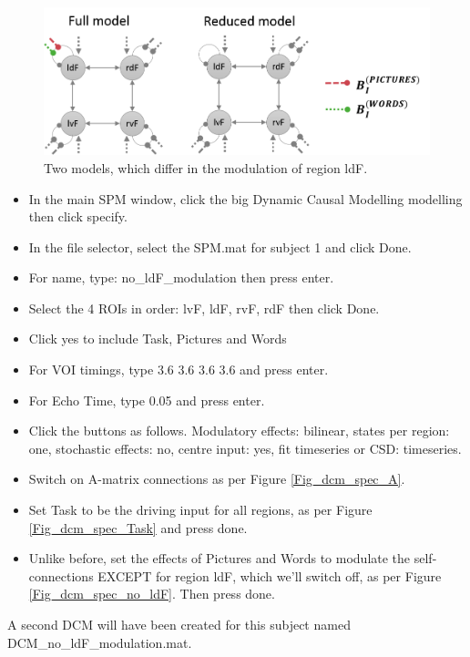 \documentclass{article}
\begin{document}
\begin{figure}[ht]
\begin{center}
\includegraphics{"Fig_dcm_spec_2models"}
\caption{Two models, which differ in the modulation of region ldF.\label{Fig_dcm_spec_2models}}
\end{center}
\end{figure}

\begin{itemize}
    \item In the main SPM window, click the big Dynamic Causal Modelling modelling then click specify.
    \item In the file selector, select the SPM.mat for subject 1 and click Done.
    \item For name, type: no\_ldF\_modulation then press enter.
    \item Select the 4 ROIs in order: lvF, ldF, rvF, rdF then click Done.
    \item Click yes to include Task, Pictures and Words
    \item For VOI timings, type 3.6  3.6  3.6  3.6 and press enter. 
    \item For Echo Time, type 0.05 and press enter.
    \item Click the buttons as follows. Modulatory effects: bilinear, states per region: one, stochastic effects: no, centre input: yes, fit timeseries or CSD: timeseries.
    \item Switch on A-matrix connections as per Figure \ref{Fig_dcm_spec_A}.
    \item Set Task to be the driving input for all regions, as per Figure \ref{Fig_dcm_spec_Task} and press done.
    \item Unlike before, set the effects of Pictures and Words to modulate the self-connections EXCEPT for region ldF, which we'll switch off, as per Figure \ref{Fig_dcm_spec_no_ldF}. Then press done.
\end{itemize}

A second DCM will have been created for this subject named DCM\_no\_ldF\_modulation.mat.
\end{document}
